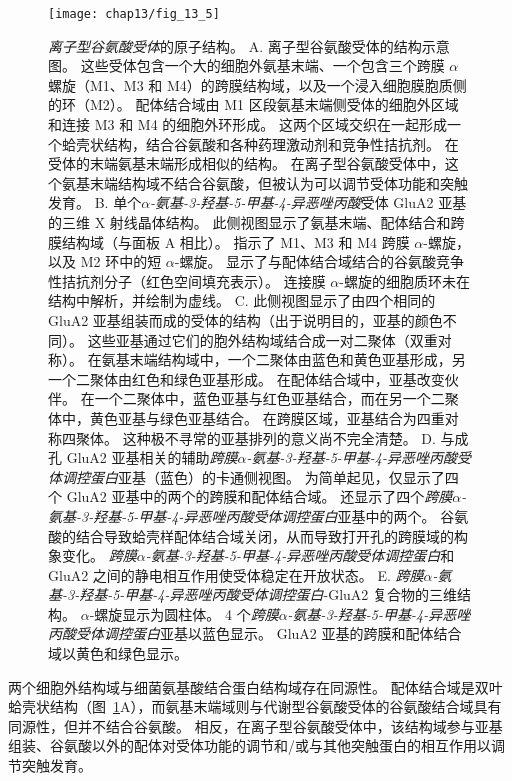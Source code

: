 \begin{figure}[htbp]
	\centering
	\texttt{[image: chap13/fig\_13\_5]}
	\caption{\textit{离子型谷氨酸受体}的原子结构。
		A. 离子型谷氨酸受体的结构示意图。 
		这些受体包含一个大的细胞外氨基末端、一个包含三个跨膜 $\alpha$螺旋（M1、M3 和 M4）的跨膜结构域，以及一个浸入细胞膜胞质侧的环（M2）。
		配体结合域由 M1 区段氨基末端侧受体的细胞外区域和连接 M3 和 M4 的细胞外环形成。
		这两个区域交织在一起形成一个蛤壳状结构，结合谷氨酸和各种药理激动剂和竞争性拮抗剂。
		在受体的末端氨基末端形成相似的结构。
		在离子型谷氨酸受体中，这个氨基末端结构域不结合谷氨酸，但被认为可以调节受体功能和突触发育\cite{armstrong1998structure}。
		B. 单个\textit{$\alpha$-氨基-3-羟基-5-甲基-4-异恶唑丙酸}受体 GluA2 亚基的三维 X 射线晶体结构。
		此侧视图显示了氨基末端、配体结合和跨膜结构域（与面板 A 相比）。
		指示了 M1、M3 和 M4 跨膜 $\alpha$-螺旋，以及 M2 环中的短 $\alpha$-螺旋。
		显示了与配体结合域结合的谷氨酸竞争性拮抗剂分子（红色空间填充表示）。
		连接膜 $\alpha$-螺旋的细胞质环未在结构中解析，并绘制为虚线\cite{sobolevsky2009x}。
		C. 此侧视图显示了由四个相同的 GluA2 亚基组装而成的受体的结构（出于说明目的，亚基的颜色不同）。
		这些亚基通过它们的胞外结构域结合成一对二聚体（双重对称）。
		在氨基末端结构域中，一个二聚体由蓝色和黄色亚基形成，另一个二聚体由红色和绿色亚基形成。
		在配体结合域中，亚基改变伙伴。
		在一个二聚体中，蓝色亚基与红色亚基结合，而在另一个二聚体中，黄色亚基与绿色亚基结合。
		在跨膜区域，亚基结合为四重对称四聚体。
		这种极不寻常的亚基排列的意义尚不完全清楚\cite{sobolevsky2009x}。
		D. 与成孔 GluA2 亚基相关的辅助\textit{跨膜$\alpha$-氨基-3-羟基-5-甲基-4-异恶唑丙酸受体调控蛋白}亚基（蓝色）的卡通侧视图。
		为简单起见，仅显示了四个 GluA2 亚基中的两个的跨膜和配体结合域。
		还显示了四个\textit{跨膜$\alpha$-氨基-3-羟基-5-甲基-4-异恶唑丙酸受体调控蛋白}亚基中的两个。
		谷氨酸的结合导致蛤壳样配体结合域关闭，从而导致打开孔的跨膜域的构象变化。
		\textit{跨膜$\alpha$-氨基-3-羟基-5-甲基-4-异恶唑丙酸受体调控蛋白}和 GluA2 之间的静电相互作用使受体稳定在开放状态\cite{mayer2016structural}。 
		E. \textit{跨膜$\alpha$-氨基-3-羟基-5-甲基-4-异恶唑丙酸受体调控蛋白}-GluA2 复合物的三维结构。
		$\alpha$-螺旋显示为圆柱体。
		4 个\textit{跨膜$\alpha$-氨基-3-羟基-5-甲基-4-异恶唑丙酸受体调控蛋白}亚基以蓝色显示。
		GluA2 亚基的跨膜和配体结合域以黄色和绿色显示\cite{mayer2016structural}。}
	\label{fig:13_5}
\end{figure}


两个细胞外结构域与细菌氨基酸结合蛋白结构域存在同源性。
配体结合域是双叶蛤壳状结构（图~\ref{fig:13_5}A），而氨基末端域则与代谢型谷氨酸受体的谷氨酸结合域具有同源性，但并不结合谷氨酸。
相反，在离子型谷氨酸受体中，该结构域参与亚基组装、谷氨酸以外的配体对受体功能的调节和/或与其他突触蛋白的相互作用以调节突触发育。



